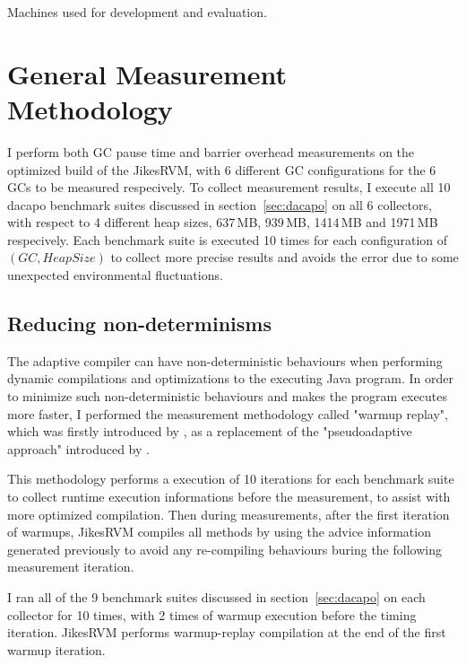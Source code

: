 \begin{table*}
  \centering
  
  \caption{Machines used for development and evaluation.}
  \label{tab:machines}
\end{table*}

\section{General Measurement Methodology}
\label{sec:generalmethod}

I perform both GC pause time and barrier overhead measurements on the optimized build
of the JikesRVM, with 6 different GC configurations for the 6 GCs to be measured respecively.
To collect measurement results, I execute all 10 dacapo benchmark suites discussed in section~\ref{sec:dacapo}
on all 6 collectors, with respect to 4 different heap sizes, 637\,MB, 939\,MB, 1414\,MB and 1971\,MB
respecively. Each benchmark suite is executed 10 times for each configuration of $(GC, HeapSize)$ to
collect more precise results and avoids the error due to some unexpected environmental fluctuations.

\subsection{Reducing non-determinisms}
\label{subsec:nondeterminisms}

The adaptive compiler can have non-deterministic behaviours when performing dynamic
compilations and optimizations to the executing Java program. In order to minimize
such non-deterministic behaviours and makes the program executes more faster, I performed
the measurement methodology called "warmup replay", which was firstly introduced by
\cite{yang2012barriers}, as a replacement of the "pseudoadaptive approach" introduced by \cite{blackburn2004barriers}.

This methodology performs a execution of 10 iterations for each benchmark suite to
collect runtime execution informations before the measurement, to assist with more optimized compilation.
Then during measurements, after the first iteration of warmups, JikesRVM compiles all
methods by using the advice information generated previously to avoid any re-compiling
behaviours buring the following measurement iteration.

I ran all of the 9 benchmark suites discussed in section~\ref{sec:dacapo} on each collector
for 10 times, with 2 times of warmup execution before the timing iteration.
JikesRVM performs warmup-replay compilation at the end of the first warmup iteration.

